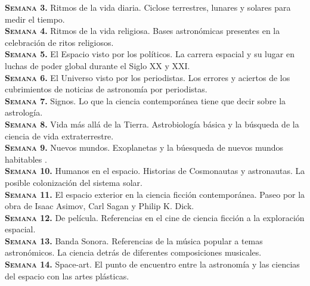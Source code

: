 \documentclass[letterpaper,10pt,onecolumn]{article}
\begin{document}
\noindent\textbf{\textsc{Semana 3.}} Ritmos de la vida diaria. Ciclose terrestres, lunares y solares para medir el tiempo.\\[-0.3cm]

\noindent\textbf{\textsc{Semana 4.}} Ritmos de la vida religiosa. Bases astron\'omicas presentes en la celebraci\'on de ritos religiosos.\\[-0.3cm]

\noindent\textbf{\textsc{Semana 5.}} El Espacio visto por los pol\'iticos. La carrera espacial y su lugar en luchas de poder global durante el Siglo XX y XXI.\\[-0.3cm] 

\noindent\textbf{\textsc{Semana 6.}} El Universo visto por los periodistas. Los errores y aciertos de los cubrimientos de noticias de astronom\'ia por periodistas. \\[-0.3cm] 


\noindent\textbf{\textsc{Semana 7.}} Signos. Lo que la ciencia contempor\'anea tiene que decir sobre la astrolog\'ia.\\[-0.3cm]

\noindent\textbf{\textsc{Semana 8.}} Vida m\'as all\'a de la Tierra. Astrobiolog\'ia b\'asica y la b\'usqueda de la ciencia de vida extraterrestre. \\[-0.3cm]

\noindent\textbf{\textsc{Semana 9.}} Nuevos mundos. Exoplanetas y la b\'uesqueda de nuevos mundos habitables .\\[-0.3cm]

\noindent\textbf{\textsc{Semana 10.}} Humanos en el espacio. Historias de Cosmonautas y astronautas. La posible colonizaci\'on del sistema solar. \\[-0.3cm]


\noindent\textbf{\textsc{Semana 11.}} El espacio exterior en la ciencia ficci\'on contempor\'anea. Paseo por la obra de Isaac Asimov, Carl Sagan y Philip K. Dick.\\[-0.3cm]

\noindent\textbf{\textsc{Semana 12.}} De pel\'icula. Referencias en el cine de ciencia ficci\'on a la exploraci\'on espacial. \\[-0.3cm]


\noindent\textbf{\textsc{Semana 13.}} Banda Sonora. Referencias de la m\'usica popular a temas astron\'omicos. La ciencia detr\'as de diferentes composiciones musicales. \\[-0.3cm]

\noindent\textbf{\textsc{Semana 14.}} Space-art. El punto de encuentro entre la astronom\'ia y las ciencias del espacio con las artes pl\'asticas.\\[-0.3cm]
\end{document}
